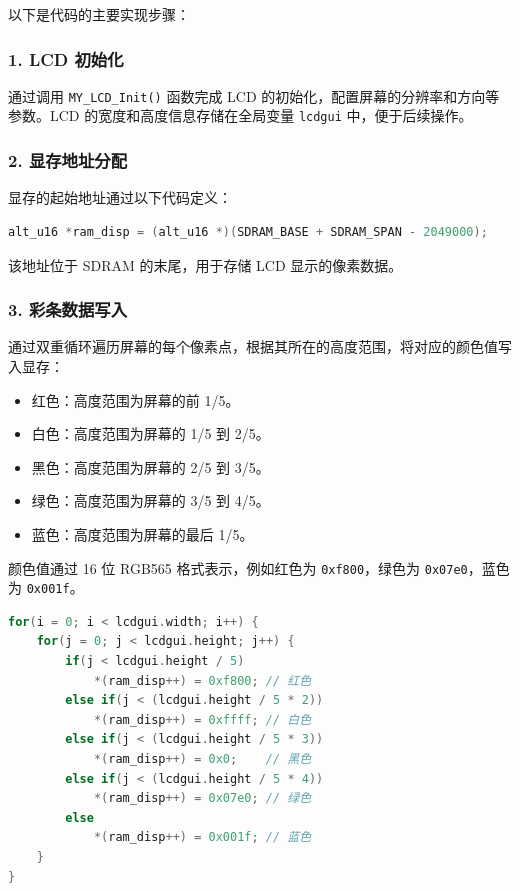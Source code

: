 \documentclass[12pt,hyperref,a4paper,UTF8]{ctexart}
\begin{document}
以下是代码的主要实现步骤：

\subsubsection*{1. LCD 初始化}
通过调用 \lstinline|MY_LCD_Init()| 函数完成 LCD 的初始化，配置屏幕的分辨率和方向等参数。LCD 的宽度和高度信息存储在全局变量 \lstinline|lcdgui| 中，便于后续操作。

\subsubsection*{2. 显存地址分配}
显存的起始地址通过以下代码定义：
\begin{lstlisting}[language=C]
alt_u16 *ram_disp = (alt_u16 *)(SDRAM_BASE + SDRAM_SPAN - 2049000);
\end{lstlisting}
该地址位于 SDRAM 的末尾，用于存储 LCD 显示的像素数据。

\subsubsection*{3. 彩条数据写入}
通过双重循环遍历屏幕的每个像素点，根据其所在的高度范围，将对应的颜色值写入显存：
\begin{itemize}
    \item 红色：高度范围为屏幕的前 1/5。
    \item 白色：高度范围为屏幕的 1/5 到 2/5。
    \item 黑色：高度范围为屏幕的 2/5 到 3/5。
    \item 绿色：高度范围为屏幕的 3/5 到 4/5。
    \item 蓝色：高度范围为屏幕的最后 1/5。
\end{itemize}
颜色值通过 16 位 RGB565 格式表示，例如红色为 \lstinline|0xf800|，绿色为 \lstinline|0x07e0|，蓝色为 \lstinline|0x001f|。

\begin{lstlisting}[language=C]
for(i = 0; i < lcdgui.width; i++) {
    for(j = 0; j < lcdgui.height; j++) {
        if(j < lcdgui.height / 5)
            *(ram_disp++) = 0xf800; // 红色
        else if(j < (lcdgui.height / 5 * 2))
            *(ram_disp++) = 0xffff; // 白色
        else if(j < (lcdgui.height / 5 * 3))
            *(ram_disp++) = 0x0;    // 黑色
        else if(j < (lcdgui.height / 5 * 4))
            *(ram_disp++) = 0x07e0; // 绿色
        else
            *(ram_disp++) = 0x001f; // 蓝色
    }
}
\end{lstlisting}
\end{document}
